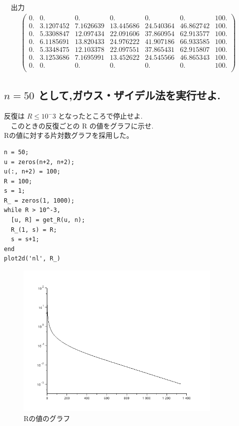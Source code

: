 \documentclass[a4j, 11pt]{jarticle}
\begin{document}
　出力\\
\begin{eqnarray*}
\left(   \begin{array}{lllllll}
0. & 0.        & 0.        & 0.        & 0.        & 0.        & 100. \\
0. & 3.1207452 & 7.1626639 & 13.445686 & 24.540364 & 46.862742 & 100. \\
0. & 5.3308847 & 12.097434 & 22.091606 & 37.860954 & 62.913577 & 100. \\
0. & 6.1185691 & 13.820433 & 24.976222 & 41.907186 & 66.933585 & 100. \\
0. & 5.3348475 & 12.103378 & 22.097551 & 37.865431 & 62.915807 & 100. \\
0. & 3.1253686 & 7.1695991 & 13.452622 & 24.545566 & 46.865343 & 100. \\
0. & 0.        & 0.        & 0.        & 0.        & 0.        & 100. \\
\end{array} \right)    
\end{eqnarray*}
\subsection{\(n = 50\) として,ガウス・ザイデル法を実行せよ.}
\label{sec:org5448c5f}
反復は \(R \leq 10^−3\) となったところで停止せよ.\\
　このときの反復ごとの R の値をグラフに示せ.\\
Rの値に対する片対数グラフを採用した。\\
\begin{verbatim}
n = 50;
u = zeros(n+2, n+2);
u(:, n+2) = 100;
R = 100;
s = 1;
R_ = zeros(1, 1000);
while R > 10^-3,
  [u, R] = get_R(u, n);
  R_(1, s) = R;
  s = s+1;
end
plot2d('nl', R_)
\end{verbatim}

\begin{figure}[htbp]
\centering
\includegraphics[width=10cm]{./1-3.png}
\caption{Rの値のグラフ}
\end{figure}
\end{document}
